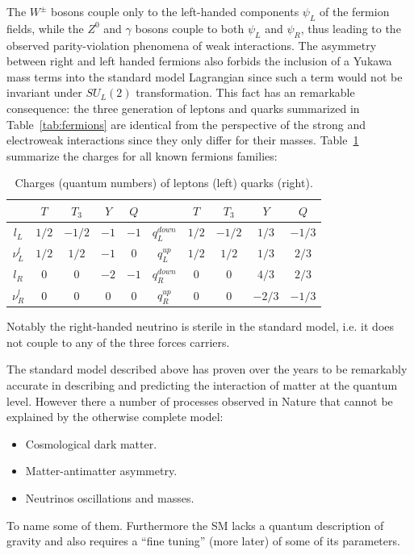 The $W^{\pm}$ bosons couple only to the left-handed components $\psi_{L}$ of the fermion fields,
while the $Z^{0}$ and $\gamma$ bosons couple to both $\psi_L$ and
$\psi_R$, thus leading to the observed parity-violation phenomena of weak interactions.
The asymmetry between right and left handed fermions also forbids the inclusion of a
Yukawa mass terms into the standard model Lagrangian since such a term would not be invariant under $SU_L(2)$
transformation.
This fact has an remarkable consequence: the three generation of leptons and quarks summarized
in Table~\ref{tab:fermions} are identical from the perspective of the strong and electroweak interactions
since they only differ for their masses.
Table~\ref{tab:charges} summarize the charges for all known fermions families: 
\begin{table}[ht]
  \begin{center}
    \begin{tabular}{|c|c|c|c|c||c|c|c|c|c|}
      \hline
      & $T$
      & $T_3$
      & $Y$
      & $Q$
        &
      & $T$
      & $T_3$
      & $Y$
      & $Q$ \\
          \hline 
      $l_L$ & $1/2$ & $-1/2$ & $-1$ & $-1$  & $q_L^{down}$ & $1/2$ & $-1/2$ & $1/3$ & $-1/3$ \\      
      $\nu_L^l$ & $1/2$ & $1/2$ & $-1$ & $0$  & $q_L^{up}$ & $1/2$ & $1/2$ & $1/3$ & $2/3$ \\
      $l_R$ & $0$ & $0$ & $-2$ & $-1$  & $q_R^{down}$ & $0$ & $0$ & $4/3$ & $2/3$ \\
      $\nu_R^l$ & $0$ & $0$ & $0$ & $0$  & $q_R^{up}$ & $0$ & $0$ & $-2/3$ & $-1/3$ \\
      \hline
    \end{tabular}
  \end{center}
  \caption{Charges (quantum numbers) of leptons (left) quarks (right).}
  \label{tab:charges}
\end{table}

Notably the right-handed neutrino is sterile in the standard model, i.e. it does not couple to
any of the three forces carriers. 

The standard model described above has proven over the years to be remarkably accurate in describing and
predicting the interaction of matter at the quantum level.
However there a number of processes observed in Nature that cannot be explained by the otherwise complete model:
\begin{itemize}
\item Cosmological dark matter.
\item Matter-antimatter asymmetry.
\item Neutrinos oscillations and masses.
\end{itemize}
To name some of them. Furthermore the SM lacks a quantum description of gravity and also requires
a ``fine tuning'' (more later) of some of its parameters.

